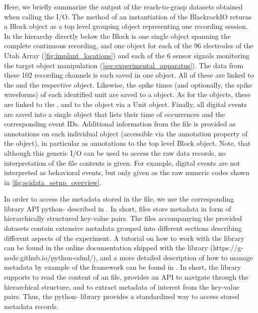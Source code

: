 {Here, we briefly summarize the output of the reach-to-grasp datasets obtained when calling the I/O. The  method of an instantiation of the BlackrockIO returns a  Block object as a top level grouping object representing one recording session. In the hierarchy directly below the Block is one single  object spanning the complete continuous recording, and one  object for each of the 96 electrodes of the Utah Array (\cref{fig:implant_locations}) and each of the 6 sensor signals monitoring the target object manipulation (\cref{sec:experimental_apparatus}). The data from these 102 recording channels is each saved in one  object. All of these are linked to the  and the respective  object. Likewise, the spike times (and optionally, the spike waveforms) of each identified unit are saved to a  object. As for the  objects, these are linked to the , and to the  object via a Unit object. Finally, all digital events are saved into a single  object that lists their time of occurrences and the corresponding event IDs. Additional information from the file is provided as annotations on each individual  object (accessible via the annotation property of the object), in particular as annotations to the top level Block object. Note, that although this generic I/O can be used to access the raw data records, no interpretation of the file contents is given. For example, digital events are not interpreted as behavioral events, but only given as the raw numeric codes shown in \cref{fig:scidata_setup_overview}. 

In order to access the metadata stored in the  file, we use the corresponding library API python- described in \cite{Grewe_2011}. In short,  files store metadata in form of hierarchically structured key-value pairs. The  files accompanying the provided datasets contain extensive metadata grouped into different sections describing different aspects of the experiment. A tutorial on how to work with the  library can be found in the online documentation shipped with the library (https://g-node.github.io/python-odml/), and a more detailed description of how to manage metadata by example of the  framework can be found in \cite{Zehl_2016}. In short, the library supports to read the content of an  file, provides an API to navigate through the hierarchical structure, and to extract metadata of interest from the key-value pairs. Thus, the python- library provides a standardized way to access stored metadata records. 

}
